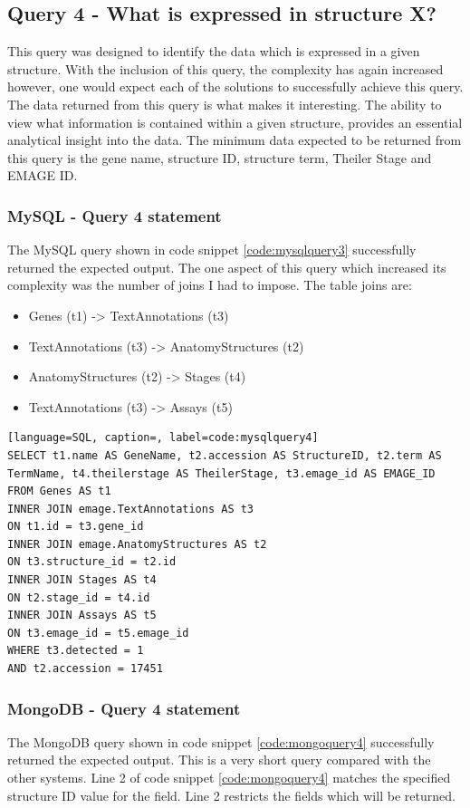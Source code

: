 \subsection*{Query 4 - What is expressed in structure X?}\label{query4}
This query was designed to identify the data which is expressed in a given structure. With the inclusion of this query, the complexity has again increased however, one would expect each of the solutions to successfully achieve this query. The data returned from this query is what makes it interesting. The ability to view what information is contained within a given structure, provides an essential analytical insight into the data. The minimum data expected to be returned from this query is the gene name, structure ID, structure term, Theiler Stage and EMAGE ID.

\subsubsection*{MySQL - Query 4 statement}\label{mysqlquery4statement}
The MySQL query shown in code snippet \ref{code:mysqlquery3} successfully returned the expected output. The one aspect of this query which increased its complexity was the number of joins I had to impose. The table joins are:

\begin{itemize}
\item Genes (t1) -> TextAnnotations (t3)
\item TextAnnotations (t3) -> AnatomyStructures (t2)
\item AnatomyStructures (t2) -> Stages (t4)
\item TextAnnotations (t3) -> Assays (t5)
\end{itemize}

\begin{lstlisting}[language=SQL, caption=, label=code:mysqlquery4]
SELECT t1.name AS GeneName, t2.accession AS StructureID, t2.term AS TermName, t4.theilerstage AS TheilerStage, t3.emage_id AS EMAGE_ID
FROM Genes AS t1
INNER JOIN emage.TextAnnotations AS t3
ON t1.id = t3.gene_id
INNER JOIN emage.AnatomyStructures AS t2
ON t3.structure_id = t2.id
INNER JOIN Stages AS t4
ON t2.stage_id = t4.id
INNER JOIN Assays AS t5
ON t3.emage_id = t5.emage_id
WHERE t3.detected = 1
AND t2.accession = 17451
\end{lstlisting}

\subsubsection*{MongoDB - Query 4 statement}\label{mongoquery4statement}
The MongoDB query shown in code snippet \ref{code:mongoquery4} successfully returned the expected output. This is a very short query compared with the other systems. Line 2 of code snippet \ref{code:mongoquery4} matches the specified structure ID value for the field. Line 2 restricts the fields which will be returned.

